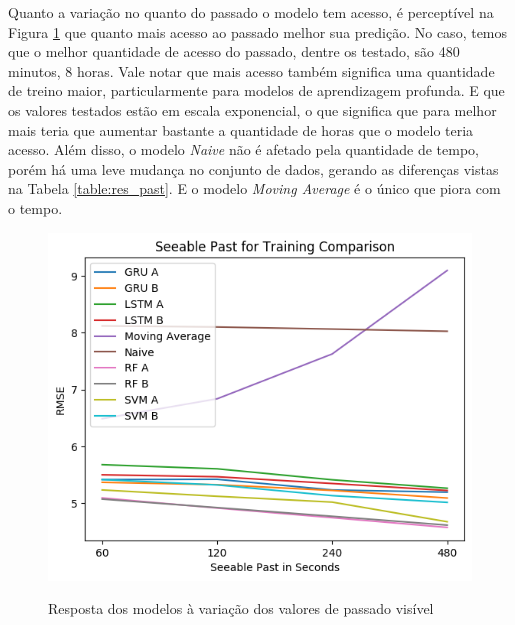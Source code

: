 
Quanto a variação no quanto do passado o modelo tem acesso, é perceptível na Figura \ref{figure:res_past} que quanto mais acesso ao passado melhor sua predição. No caso, temos que o melhor quantidade de acesso do passado, dentre os testado, são 480 minutos, 8 horas. Vale notar que mais acesso também significa uma quantidade de treino maior, particularmente para modelos de aprendizagem profunda. E que os valores testados estão em escala exponencial, o que significa que para melhor mais teria que aumentar bastante a quantidade de horas que o modelo teria acesso. Além disso, o modelo \textit{Naive} não é afetado pela quantidade de tempo, porém há uma leve mudança no conjunto de dados, gerando as diferenças vistas na Tabela \ref{table:res_past}. E o modelo \textit{Moving Average} é o único que piora com o tempo. 

\begin{figure}[htbp]
    \centering
    \includegraphics[scale=0.8]{monography/img/seeable_past_for_training_comparison_rmse.png}
    \label{figure:res_past}
    \caption[Resposta dos modelos à variação dos valores de passado visível]{Resposta dos modelos à variação dos valores de passado visível}
\end{figure}
 

